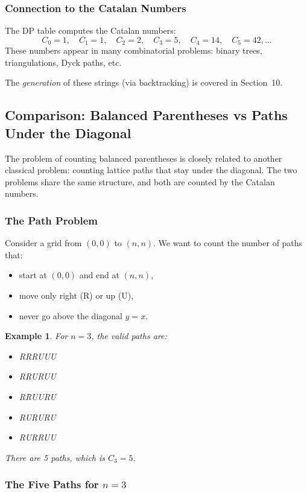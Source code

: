 \documentclass[11pt,a4paper]{article}
\newtheorem{example}[theorem]{Example}
\begin{document}
\subsubsection{Connection to the Catalan Numbers}

The DP table computes the Catalan numbers:
\[
C_0 = 1, \quad C_1 = 1, \quad C_2 = 2, \quad C_3 = 5, \quad C_4 = 14, \quad C_5 = 42, \dots
\]
These numbers appear in many combinatorial problems: binary trees, triangulations, Dyck paths, etc.

The \emph{generation} of these strings (via backtracking) is covered in Section~10.

\subsection{Comparison: Balanced Parentheses vs Paths Under the Diagonal}

The problem of counting balanced parentheses is closely related to another classical problem: counting lattice paths that stay under the diagonal. The two problems share the same structure, and both are counted by the Catalan numbers.

\subsubsection{The Path Problem}

Consider a grid from \( (0,0) \) to \( (n,n) \). We want to count the number of paths that:
\begin{itemize}
    \item start at \( (0,0) \) and end at \( (n,n) \),
    \item move only right (R) or up (U),
    \item never go above the diagonal \( y = x \).
\end{itemize}

\begin{example}
For \( n = 3 \), the valid paths are:
\begin{itemize}
    \item RRRUUU
    \item RRURUU
    \item RRUURU
    \item RURURU
    \item RURRUU
\end{itemize}
There are 5 paths, which is \( C_3 = 5 \).
\end{example}

\subsubsection{\texorpdfstring{The Five Paths for \( n = 3 \)}{The Five Paths for n = 3}}
\end{document}
